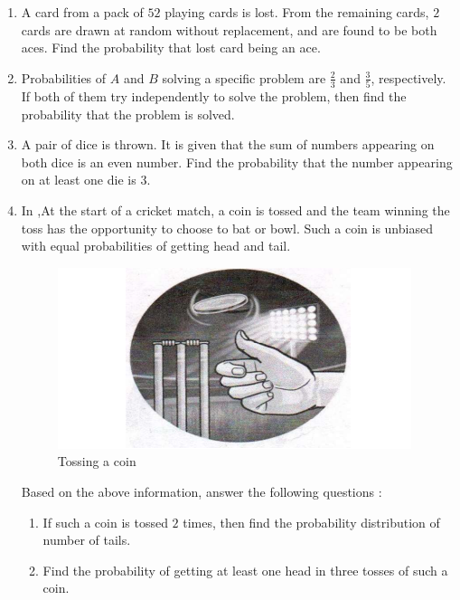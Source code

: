 \begin{enumerate}[label=\thesection.\arabic*.,ref=\thesection.\theenumi]
\item A card from a pack of $52$ playing cards is lost. From the remaining cards, $2$ cards are drawn at random without replacement, and are found to be both aces. Find the probability that lost card being an ace.

\item Probabilities of $A$ and $B$ solving a specific problem are $\frac{2}{3}$ and $\frac{3}{5}$, respectively. If both of them try independently to solve the problem, then 
find the probability that the problem is solved.

\item A pair of dice is thrown. It is given that the sum of numbers appearing on both dice is an even number. Find the probability that the number appearing on at least one die is $3$.

\item In ,At the start of a cricket match, a coin is tossed and the team winning the 
toss has the opportunity to choose to bat or bowl. Such a coin is unbiased 
with equal probabilities of getting head and tail.

\begin{figure}[H]
        \centering
        \includegraphics[width=\columnwidth]{./figs/Screenshot (19).png}
        \caption{Tossing a coin}
        \label{fig:2022/probability/fig1.png}
    \end{figure}

Based on the above information, answer the following questions :
\begin{enumerate}[label=(\alph*)]
 \item  If such a coin is tossed $2$ times, then find the probability 
distribution of number of tails.
 
 \item Find the probability of getting at least one head in three tosses of 
such a coin. 
\end{enumerate}


\end{enumerate}
